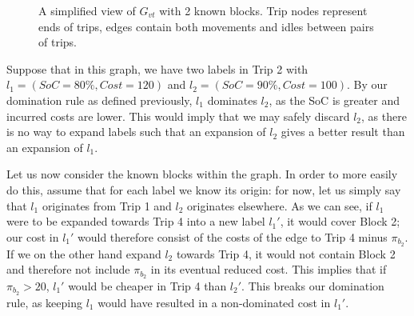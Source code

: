 \documentclass[]{article}
\begin{document}
\begin{figure}[h]
  \centering
  \caption{A simplified view of $G_{vt}$ with 2 known blocks. Trip nodes represent ends of trips, edges contain both movements and idles between pairs of trips.}
  \label{fig:evsp-graph-blocks}
\end{figure}

Suppose that in this graph, we have two labels in Trip 2 with $l_1 = (SoC = 80\%, Cost = 120)$ and $l_2 = (SoC = 90\%, Cost = 100)$. By our domination rule as defined previously, $l_1$ dominates $l_2$, as the SoC is greater and incurred costs are lower. This would imply that we may safely discard $l_2$, as there is no way to expand labels such that an expansion of $l_2$ gives a better result than an expansion of $l_1$.

Let us now consider the known blocks within the graph. In order to more easily do this, assume that for each label we know its origin: for now, let us simply say that $l_1$ originates from Trip 1 and $l_2$ originates elsewhere. As we can see, if $l_1$ were to be expanded towards Trip 4 into a new label $l_1'$, it would cover Block 2; our cost in $l_1'$ would therefore consist of the costs of the edge to Trip 4 minus $\pi_{b_2}$. If we on the other hand expand $l_2$ towards Trip 4, it would not contain Block 2 and therefore not include $\pi_{b_2}$ in its eventual reduced cost. This implies that if $\pi_{b_2} > 20$, $l_1'$ would be cheaper in Trip 4 than $l_2'$. This breaks our domination rule, as keeping $l_1$ would have resulted in a non-dominated cost in $l_1'$.
\end{document}
